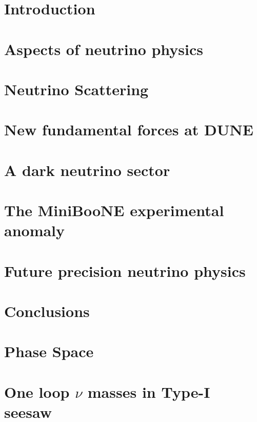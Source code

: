 \documentclass[openany,twoside,frontopenright]{ip3thesis}
\begin{document}
\chapter{Introduction}



\chapter{Aspects of neutrino physics}


\chapter{Neutrino Scattering}


\chapter{New fundamental forces at DUNE}


\chapter{A dark neutrino sector}
%

\chapter{The MiniBooNE experimental anomaly}
%

\chapter{Future precision neutrino physics}
%

\chapter{Conclusions}


\appendixpageoff
\begin{appendices}
\let\clearpage\relax
\chapter{Phase Space}


\cleardoublepage
\chapter{One loop $\nu$ masses in Type-I seesaw}

\end{appendices}



\end{document}
